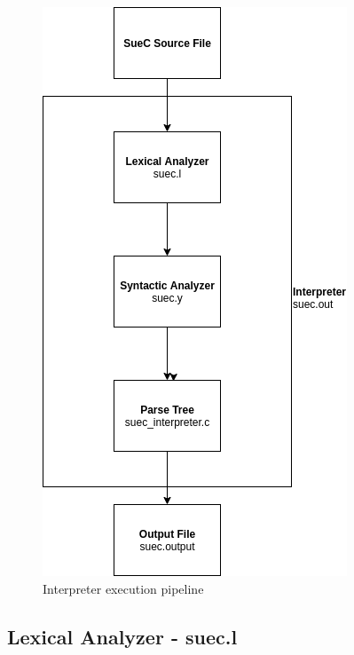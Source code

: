 \documentclass[12pt,a4paper,twoside]{report}
\begin{document}
\begin{figure}[H]
    \centering
    \includegraphics[width=0.45\linewidth]{img/diags/InterpreterPipeline.png}
    \caption{Interpreter execution pipeline}
    \label{fig:conf}
\end{figure}


\subsection{Lexical Analyzer - suec.l}
\end{document}
